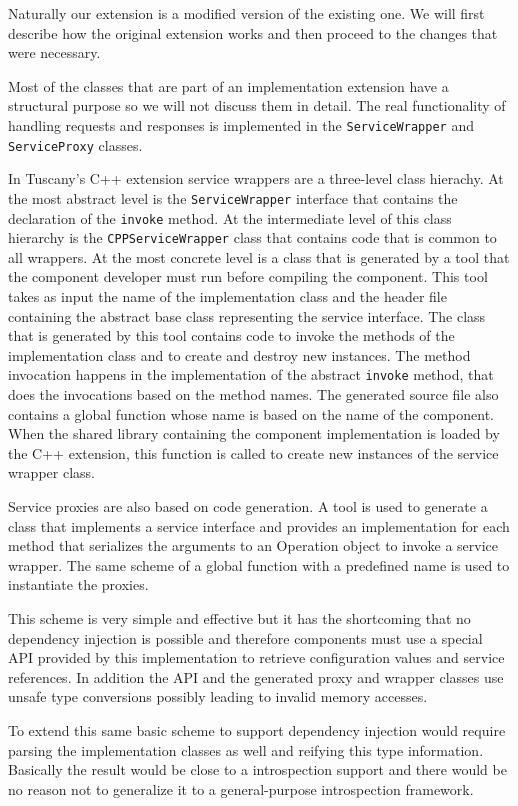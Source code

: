 Naturally our extension is a modified version of the existing one. We will first describe how the original extension works
and then proceed to the changes that were necessary.
 
Most of the classes that are part of an implementation extension have a structural purpose so we will not discuss them in
detail. The real functionality of handling requests and responses is implemented in the \texttt{ServiceWrapper} and 
\texttt{ServiceProxy} classes. 

In Tuscany's C++ extension service wrappers are a three-level class hierachy. At the most abstract level is the
\texttt{ServiceWrapper} interface that contains the declaration of the \texttt{invoke} method. At the intermediate level of
this class hierarchy is the \texttt{CPPServiceWrapper} class that contains code that is common to all wrappers.
At the most concrete level is a class that is generated by a tool that the component developer must run before
compiling the component. This tool takes as input the name of the implementation class and the header file containing
the abstract base class representing the service interface. The class that is generated by this tool contains code
to invoke the methods of the implementation class and to create and destroy new instances. The method invocation
happens in the implementation of the abstract \texttt{invoke} method, that does the invocations based on the method names.
The generated source file also contains a global function whose name is based on the name of the component. When
the shared library containing the component implementation is loaded by the C++ extension, this function is called
to create new instances of the service wrapper class.

Service proxies are also based on code generation. A tool is used to generate a class that implements a service interface
and provides an implementation for each method that serializes the arguments to an Operation object to invoke a service
wrapper. The same scheme of a global function with a predefined name is used to instantiate the proxies.

This scheme is very simple and effective but it has the shortcoming that no dependency injection is possible and
therefore components must use a special API provided by this implementation to retrieve configuration values and
service references. In addition the API and the generated proxy and wrapper classes use unsafe type conversions
possibly leading to invalid memory accesses.

To extend this same basic scheme to support dependency injection would require parsing the implementation classes
as well and reifying this type information. Basically the result would be close to a introspection support
and there would be no reason not to generalize it to a general-purpose introspection framework.


